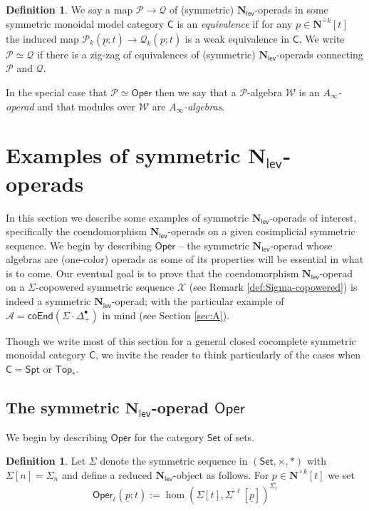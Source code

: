 \documentclass[11pt]{amsart}
\theoremstyle{definition}
\newtheorem{definition}[subsection]{Definition}
\theoremstyle{remark}
\newcommand{\Top}{\mathsf{Top}_*}
\newcommand{\Spt}{\mathsf{Spt}}
\newcommand{\Oper}{\mathsf{Oper}}
\newcommand{\pt}{*}
\newcommand{\Cal}[1]{\mathcal{#1}}
\newcommand{\Ncirc}[1]{\mathbf{N}^{\hat{\circ}#1}}
\newcommand{\boxcirc}{\mathring{\square}}
\newcommand{\Nl}{\mathbf{N}_{\mathsf{lev}}}
\newcommand{\SD}{\Sigma{\cdot}\Delta^{\bullet}}
\begin{document}
\begin{definition} \label{def:equiv-of-Nl-ops} We say a map $\Cal{P}\to\Cal{Q}$ of (symmetric) $\Nl$-operads in some symmetric monoidal model category $\mathsf{C}$ is an \textit{equivalence} if for any $\underline{p}\in\Ncirc{k}[t]$ the induced map $\Cal{P}_k(\underline{p};t)\to\Cal{Q}_k(\underline{p};t)$ is a weak equivalence in $\mathsf{C}$. We write $\Cal{P}\simeq \Cal{Q}$ if there is a zig-zag of equivalences of (symmetric) $\Nl$-operads connecting $\Cal{P}$ and $\Cal{Q}$. 

In the special case that $\Cal{P}\simeq \Oper$ then we say that a $\Cal{P}$-algebra $\Cal{W}$ is an \textit{$A_{\infty}$-operad} and that modules over $\Cal{W}$ are \textit{$A_{\infty}$-algebras}.
\end{definition}

\section{Examples of symmetric $\Nl$-operads}
In this section we describe some examples of symmetric $\Nl$-operads of interest, specifically the coendomorphism $\Nl$-operads on a given cosimplicial symmetric sequence. We begin by describing $\Oper$ -- the symmetric $\Nl$-operad whose algebras are (one-color) operads as some of its properties will be essential in what is to come. Our eventual goal is to prove that the coendomorphism $\Nl$-operad on a $\Sigma$-copowered symmetric sequence $\Cal{X}$ (see Remark \ref{def:Sigma-copowered}) is indeed a symmetric $\Nl$-operad; with the particular example of $\Cal{A}= \mathsf{coEnd}(\SD_+)$ in mind (see Section \ref{sec:A}). 

Though we write most of this section for a general closed cocomplete symmetric monoidal category $\mathsf{C}$, we invite the reader to think particularly of the cases when $\mathsf{C}=\Spt$ or $\Top$.

\subsection{The symmetric $\Nl$-operad $\Oper$} \label{sec:oper-def}
We begin by describing $\Oper$ for the category $\mathsf{Set}$ of sets.

\begin{definition} \label{def-of-Oper} %
    Let $\Sigma$ denote the symmetric sequence in $(\mathsf{Set}, \times, \pt)$ with $\Sigma[n]=\Sigma_n$ and define a reduced $\Nl$-object as follows. For $\underline{p}\in \Ncirc{k}[t]$ we set \[ \Oper_{\ell}( \underline{p};t) := \hom\left( \Sigma[t] , \Sigma^{\boxcirc \ell}[\underline{p}] \right)^{\Sigma_t}\]
\end{definition}
\end{document}

